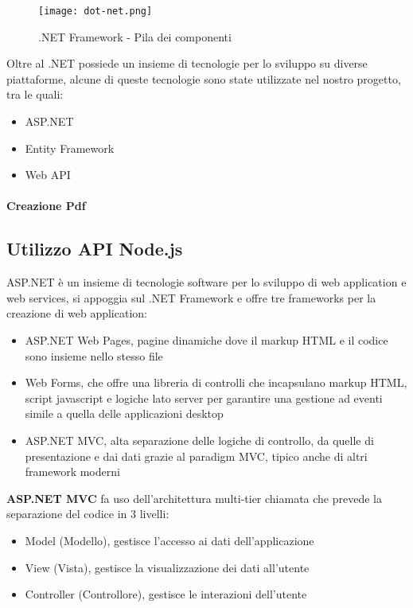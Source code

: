 \begin{figure}[H]
    \centering
    \texttt{[image: dot-net.png]}
    \caption{.NET Framework - Pila dei componenti}
    \label{fig:DotNet}
\end{figure}

Oltre al  .NET possiede un insieme di tecnologie per lo sviluppo su diverse piattaforme, alcune di queste tecnologie sono state utilizzate nel nostro progetto, tra le quali:
\begin{itemize}
    \item ASP.NET
    \item Entity Framework
    \item Web API
\end{itemize}



\paragraph {Creazione Pdf}


\subsection{Utilizzo API Node.js}

ASP.NET è un insieme di tecnologie software per lo sviluppo di web application e web services, si appoggia sul .NET Framework e offre tre frameworks per la creazione di web application: 
\begin{itemize}
	\item ASP.NET Web Pages, pagine dinamiche dove il markup HTML e il codice sono insieme nello stesso file
	\item Web Forms, che offre una libreria di controlli che incapsulano markup HTML, script javascript e logiche lato server per garantire una gestione ad eventi simile a quella delle applicazioni desktop
	\item ASP.NET MVC, alta separazione delle logiche di controllo, da quelle di presentazione e dai dati grazie al paradigm MVC, tipico anche di altri framework moderni
\end{itemize}

\textbf{ASP.NET MVC} fa uso dell'architettura multi-tier chiamata  che prevede la separazione del codice in 3 livelli:
\begin{itemize}
    \item Model (Modello), gestisce l'accesso ai dati dell'applicazione
    \item View (Vista), gestisce la visualizzazione dei dati all'utente
    \item Controller (Controllore), gestisce le interazioni dell'utente
\end{itemize}

